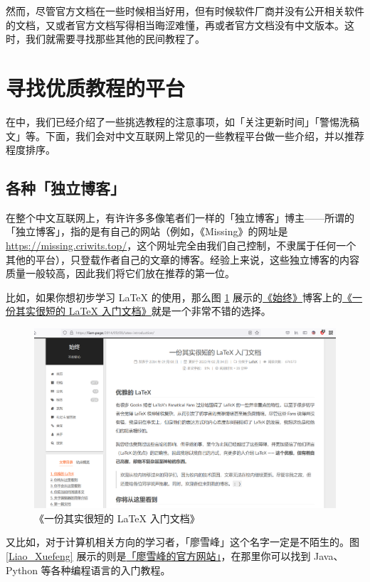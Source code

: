 然而，尽管官方文档在一些时候相当好用，但有时候软件厂商并没有公开相关软件的文档，又或者官方文档写得相当晦涩难懂，再或者官方文档没有中文版本。这时，我们就需要寻找那些其他的民间教程了。

\section{寻找优质教程的平台}

在中，我们已经介绍了一些挑选教程的注意事项，如「关注更新时间」「警惕洗稿文」等。下面，我们会对中文互联网上常见的一些教程平台做一些介绍，并以推荐程度排序。

\subsection{各种「独立博客」}

在整个中文互联网上，有许许多多像笔者们一样的「独立博客」博主——所谓的「独立博客」，指的是有自己的网站（例如，《Missing》的网址是 \url{https://missing.criwits.top/}，这个网址完全由我们自己控制，不隶属于任何一个其他的平台），只登载作者自己的文章的博客。经验上来说，这些独立博客的内容质量一般较高，因此我们将它们放在推荐的第一位。

比如，如果你想初步学习 \LaTeX{} 的使用，那么图 \ref{Liam_LaTeX_tutorial} 展示的\href{https://liam.page}{《始终》}博客上的\href{https://liam.page/2014/09/08/latex-introduction/}{《一份其实很短的 \LaTeX{} 入门文档》}就是一个非常不错的选择。

\begin{figure}[htb!]
  \centering
  \includegraphics[width=12cm]{assets/Liam_LaTeX_tutorial.png}
  \caption{《一份其实很短的 \LaTeX{} 入门文档》}
  \label{Liam_LaTeX_tutorial}
\end{figure}

又比如，对于计算机相关方向的学习者，「廖雪峰」这个名字一定是不陌生的。图 \ref{Liao_Xuefeng} 展示的则是\href{https://www.liaoxuefeng.com/}{「廖雪峰的官方网站」}，在那里你可以找到 Java、Python 等各种编程语言的入门教程。

